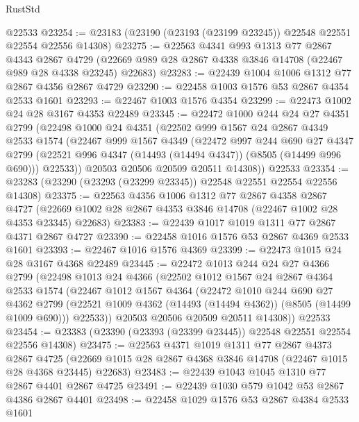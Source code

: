 \begin{lexlean}{RustStd}
\begin{coremodule}
    @22533
@23254 := @23183 (@23190 (@23193 (@23199 @23245)) @22548 @22551 @22554 @22556 @14308)
@23275 := @22563
    @4341
    @993
    @1313
    @77
    @2867
    @4343
    @2867
    @4729
    (@22669 @989 @28 @2867 @4338 @3846 @14708 (@22467 @989 @28 @4338 @23245) @22683)
@23283 := @22439 @1004 @1006 @1312 @77 @2867 @4356 @2867 @4729
@23290 := @22458 @1003 @1576 @53 @2867 @4354 @2533 @1601
@23293 := @22467 @1003 @1576 @4354
@23299 := @22473 @1002 @24 @28 @3167 @4353 @22489
@23345 := @22472
    @1000
    @244
    @24
    @27
    @4351
    @2799
    (@22498
      @1000
      @24
      @4351
      (@22502
        @999
        @1567
        @24
        @2867
        @4349
        @2533
        @1574
        (@22467
          @999
          @1567
          @4349
          (@22472
            @997
            @244
            @690
            @27
            @4347
            @2799
            (@22521 @996 @4347 (@14493 (@14494 @4347)) (@8505 (@14499 @996 @690)))
            @22533))
        @20503
        @20506
        @20509
        @20511
        @14308))
    @22533
@23354 := @23283 (@23290 (@23293 (@23299 @23345)) @22548 @22551 @22554 @22556 @14308)
@23375 := @22563
    @4356
    @1006
    @1312
    @77
    @2867
    @4358
    @2867
    @4727
    (@22669 @1002 @28 @2867 @4353 @3846 @14708 (@22467 @1002 @28 @4353 @23345) @22683)
@23383 := @22439 @1017 @1019 @1311 @77 @2867 @4371 @2867 @4727
@23390 := @22458 @1016 @1576 @53 @2867 @4369 @2533 @1601
@23393 := @22467 @1016 @1576 @4369
@23399 := @22473 @1015 @24 @28 @3167 @4368 @22489
@23445 := @22472
    @1013
    @244
    @24
    @27
    @4366
    @2799
    (@22498
      @1013
      @24
      @4366
      (@22502
        @1012
        @1567
        @24
        @2867
        @4364
        @2533
        @1574
        (@22467
          @1012
          @1567
          @4364
          (@22472
            @1010
            @244
            @690
            @27
            @4362
            @2799
            (@22521 @1009 @4362 (@14493 (@14494 @4362)) (@8505 (@14499 @1009 @690)))
            @22533))
        @20503
        @20506
        @20509
        @20511
        @14308))
    @22533
@23454 := @23383 (@23390 (@23393 (@23399 @23445)) @22548 @22551 @22554 @22556 @14308)
@23475 := @22563
    @4371
    @1019
    @1311
    @77
    @2867
    @4373
    @2867
    @4725
    (@22669 @1015 @28 @2867 @4368 @3846 @14708 (@22467 @1015 @28 @4368 @23445) @22683)
@23483 := @22439 @1043 @1045 @1310 @77 @2867 @4401 @2867 @4725
@23491 := @22439 @1030 @579 @1042 @53 @2867 @4386 @2867 @4401
@23498 := @22458 @1029 @1576 @53 @2867 @4384 @2533 @1601

\end{coremodule}
\end{lexlean}
